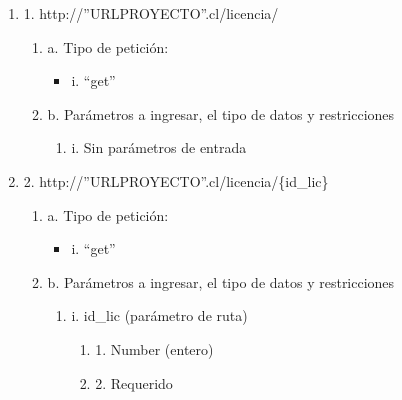 \begin{enumerate}
    \item 1. http://”URLPROYECTO”.cl/licencia/
    \begin{enumerate}
        \item a. Tipo de petición:
            \begin{itemize}
               \item i. “get”
            \end{itemize}
        \item b. Parámetros a ingresar, el tipo de datos y restricciones
            \begin{enumerate}
                \item i. Sin parámetros de entrada
            \end{enumerate}
    \end{enumerate}

    \item 2. http://”URLPROYECTO”.cl/licencia/\{id\_lic\}
    \begin{enumerate}
        \item a. Tipo de petición:
            \begin{itemize}
               \item i. “get”
            \end{itemize}
        \item b. Parámetros a ingresar, el tipo de datos y restricciones
            \begin{enumerate}
                \item i. id\_lic (parámetro de ruta)
                    \begin{enumerate}
                        \item 1. Number (entero)
                        \item 2. Requerido
                    \end{enumerate}
            \end{enumerate}
    \end{enumerate}


\end{enumerate}
